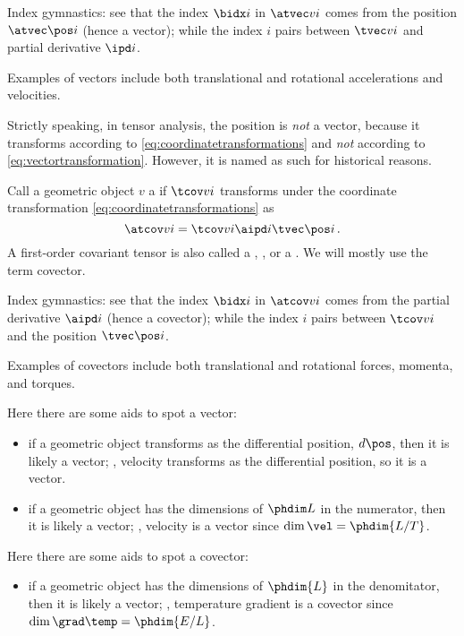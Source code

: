 \begin{note}
  Index gymnastics: see that the index $\bidx i$ in $\atvec v i$ comes from the position $\atvec\pos i$ (hence a vector); while the index $i$ pairs between $\tvec vi$ and partial derivative $\ipd i$.
\end{note}


Examples of vectors include both translational and rotational accelerations and velocities.

\begin{remark}
  Strictly speaking, in tensor analysis, the position  is \emph{not} a vector, because it transforms according to \cref{eq:coordinatetransformations} and \emph{not} according to \cref{eq:vectortransformation}. However, it is named as such for historical reasons.
\end{remark}

\begin{definition}
  Call a geometric object $v$ a  if $\tcov vi$ transforms under the coordinate transformation \cref{eq:coordinatetransformations} as  
  \begin{equation*}
    \atcov v i = \tcov vi\aipd i\tvec\pos i\,.
  \end{equation*}
  A first-order covariant tensor is also called a , , or a . We will mostly use the term covector.
\end{definition}

\begin{note}
  Index gymnastics: see that the index $\bidx i$ in $\atcov v i$ comes from the partial derivative $\aipd i$ (hence a covector); while the index $i$ pairs between $\tcov vi$ and the position $\tvec\pos i$.
\end{note}

Examples of covectors include both translational and rotational forces, momenta, and torques.

\begin{note}
  Here there are some aids to spot a vector:
  \begin{itemize}
    \item if a geometric object transforms as the differential position, $d\pos$, then it is likely a vector; \eg, velocity transforms as the differential position, so it is a vector.
    \item if a geometric object has the dimensions of $\phdim L$ in the numerator, then it is likely a vector; \eg, velocity is a vector since $\dim\vel = \phdim{L/T}$.
  \end{itemize}
  
  Here there are some aids to spot a covector:
  \begin{itemize}
    \item if a geometric object has the dimensions of $\phdim{L}$ in the denomitator, then it is likely a vector; \eg, temperature gradient is a covector since $\dim\grad\temp = \phdim{E/L}$.
  \end{itemize}
\end{note}


